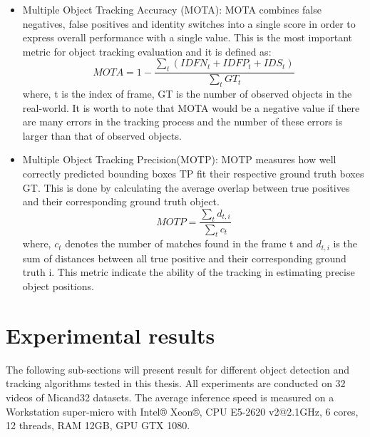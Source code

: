 \begin{itemize}
	\item Multiple Object Tracking Accuracy (MOTA): MOTA combines false negatives, false positives and identity switches into a single score in order to express overall performance with a single value. This is the most important metric for object tracking evaluation and it is defined as:
	\begin{equation}
		MOTA = 1 - \frac{\sum _t (IDFN_t+IDFP_t+IDS_t)}{\sum _t GT_t}
	\end{equation}
where, t is the index of frame, GT is the number of observed objects in the real-world. It is worth to note that MOTA would be a negative value if there are many errors in the tracking process and the number of these errors is larger than that of observed objects.
	\item Multiple Object Tracking Precision(MOTP): MOTP measures how well correctly predicted bounding boxes TP fit their respective ground truth boxes GT. This is done by calculating the average overlap between true positives and their corresponding ground truth object.
	\begin{equation}
		MOTP = \frac{\sum _t d_{t,i}}{\sum _t c_t}
	\end{equation}
where, \(c_t\) denotes the number of matches found in the frame t and \(d_{t,i}\) is the sum of distances between all true positive and their corresponding ground truth i. This metric indicate the ability of the tracking in estimating precise object positions.
\end{itemize}
\section{Experimental results}
The following sub-sections will present result for different object detection and tracking algorithms tested in this thesis. All experiments are conducted on 32 videos of Micand32 datasets. The average inference speed is measured on a Workstation super-micro with Intel® Xeon®, CPU E5-2620 v2@2.1GHz, 6 cores, 12 threads, RAM 12GB, GPU GTX 1080.
